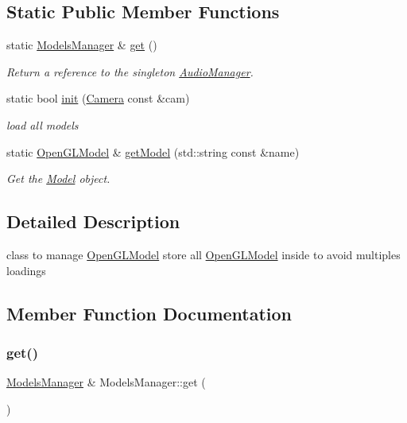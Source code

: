 \subsection*{Static Public Member Functions}
\begin{DoxyCompactItemize}
\item 
static \hyperlink{class_models_manager}{Models\+Manager} \& \hyperlink{class_models_manager_a124d5bc78204e5bb108d0d4074cda8bf}{get} ()
\begin{DoxyCompactList}\small\item\em Return a reference to the singleton \hyperlink{class_audio_manager}{Audio\+Manager}. \end{DoxyCompactList}\item 
static bool \hyperlink{class_models_manager_a0802e2a4579035e27f7b273b67e5df71}{init} (\hyperlink{class_camera}{Camera} const \&cam)
\begin{DoxyCompactList}\small\item\em load all models \end{DoxyCompactList}\item 
static \hyperlink{class_open_g_l_model}{Open\+G\+L\+Model} \& \hyperlink{class_models_manager_ab6b2cbeed2e20b4a6af747b782c3d04b}{get\+Model} (std\+::string const \&name)
\begin{DoxyCompactList}\small\item\em Get the \hyperlink{class_model}{Model} object. \end{DoxyCompactList}\end{DoxyCompactItemize}


\subsection{Detailed Description}
class to manage \hyperlink{class_open_g_l_model}{Open\+G\+L\+Model} store all \hyperlink{class_open_g_l_model}{Open\+G\+L\+Model} inside to avoid multiples loadings 

\subsection{Member Function Documentation}
\mbox{\label{class_models_manager_a124d5bc78204e5bb108d0d4074cda8bf}} 
\subsubsection{\texorpdfstring{get()}{get()}}
{\footnotesize\ttfamily \hyperlink{class_models_manager}{Models\+Manager} \& Models\+Manager\+::get (\begin{DoxyParamCaption}{ }\end{DoxyParamCaption})\hspace{0.3cm}{\ttfamily [static]}}



